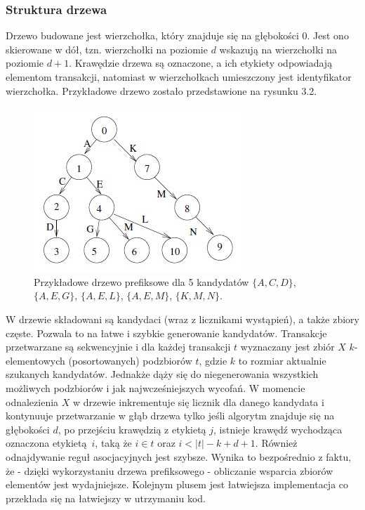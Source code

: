 \subsubsection*{Struktura drzewa}
Drzewo budowane jest wierzchołka, który znajduje się na głębokości 0. Jest ono skierowane w dół, tzn. wierzchołki na poziomie \(d\) wskazują na wierzchołki na poziomie \(d + 1\). Krawędzie drzewa są oznaczone, a ich etykiety odpowiadają elementom transakcji, natomiast w wierzchołkach umieszczony jest identyfikator wierzchołka. Przykładowe drzewo zostało przedstawione na rysunku 3.2. 
\begin{figure}[h]
	\centering
	\includegraphics[width=0.5\linewidth]{figures/prefixTreeBodon}
	\caption[Rysunek 3.2]{Przykładowe drzewo prefiksowe dla 5 kandydatów \(\{A,C,D\}\), \(\{A,E,G\}\), \(\{A,E,L\}\), \(\{A,E,M\}\), \(\{K,M,N\}\).}
	\label{fig:prefixTreeBodon}
\end{figure}
W drzewie składowani są kandydaci (wraz z licznikami wystąpień), a także zbiory częste. Pozwala to na łatwe i szybkie generowanie kandydatów. Transakcje przetwarzane są sekwencyjnie i dla każdej transakcji \(t\) wyznaczany jest zbiór \(X\) \(k\)-elementowych (posortowanych) podzbiorów \(t\), gdzie \(k\) to rozmiar aktualnie szukanych kandydatów. Jednakże dąży się do niegenerowania wszystkich możliwych podzbiorów i jak najwcześniejszych wycofań. W momencie odnalezienia \(X\) w drzewie inkrementuje się licznik dla danego kandydata i kontynuuje przetwarzanie w głąb drzewa tylko jeśli algorytm znajduje się na głębokości \(d\), po przejściu krawędzią z etykietą \(j\), istnieje krawędź wychodząca oznaczona etykietą~\(i\), taką że \(i\in t\) oraz \(i < |t| - k + d + 1\). Również odnajdywanie reguł asocjacyjnych jest szybsze. Wynika to bezpośrednio z faktu, że - dzięki wykorzystaniu drzewa prefiksowego - obliczanie wsparcia zbiorów elementów jest wydajniejsze. Kolejnym plusem jest łatwiejsza implementacja co przekłada się na łatwiejszy w utrzymaniu kod.  

